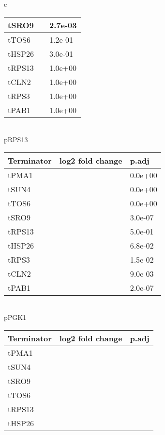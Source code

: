 \documentclass[../main.tex]{subfiles}
\begin{document}
\begin{table}[ph!]
{\begin{tabular}{ c }
\begin{tabularx}{0.8\textwidth} { 
  | >{\centering\arraybackslash}X 
  | >{\centering\arraybackslash}X 
  | >{\centering\arraybackslash}X | }
\hline
tSRO9 & -1.0514050 & 2.7e-03\\
\hline
tTOS6 & -0.6661552 & 1.2e-01\\
\hline
tHSP26 & -0.5293229 & 3.0e-01\\
\hline
tRPS13 & -0.3155979 & 1.0e+00\\
\hline
tCLN2 & -0.1610090 & 1.0e+00\\
\hline
tRPS3 & -0.0913532 & 1.0e+00\\
\hline
tPAB1 & 0.1215476 & 1.0e+00\\
\hline
\end{tabularx} \\
pRPS13 \\
\begin{tabularx}{0.8\textwidth} { 
  | >{\centering\arraybackslash}X 
  | >{\centering\arraybackslash}X 
  | >{\centering\arraybackslash}X | }
\hline
\textbf{Terminator} & \textbf{log2 fold change} & \textbf{p.adj}\\
\hline
tPMA1 & -2.0420263 & 0.0e+00\\
\hline
tSUN4 & -1.7210314 & 0.0e+00\\
\hline
tTOS6 & -0.8907257 & 0.0e+00\\
\hline
tSRO9 & -0.5765566 & 3.0e-07\\
\hline
tRPS13 & 0.0611790 & 5.0e-01\\
\hline
tHSP26 & 0.1966032 & 6.8e-02\\
\hline
tRPS3 & 0.2642338 & 1.5e-02\\
\hline
tCLN2 & 0.2901645 & 9.0e-03\\
\hline
tPAB1 & 0.5886753 & 2.0e-07\\
\hline
\end{tabularx} \\
pPGK1 \\
\begin{tabularx}{0.8\textwidth} { 
  | >{\centering\arraybackslash}X 
  | >{\centering\arraybackslash}X 
  | >{\centering\arraybackslash}X | }
\hline
\textbf{Terminator} & \textbf{log2 fold change} & \textbf{p.adj}\\
\hline
tPMA1 & -2.7277132 & 0.0000\\
\hline
tSUN4 & -1.5208626 & 0.0000\\
\hline
tSRO9 & -1.3242251 & 0.0000\\
\hline
tTOS6 & -0.8517308 & 0.0000\\
\hline
tRPS13 & -0.3294545 & 0.0390\\
\hline
tHSP26 & -0.3162353 & 0.0390\\

\end{tabularx}
\end{tabular}}
\end{table}
\end{document}
